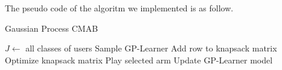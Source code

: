 The pseudo code of the algoritm we implemented is as follow.
\begin{algorithm}
	\caption{Gaussian Process CMAB}
	\begin{algorithmic}[1]
		\STATE $J\gets ${ all classes of users}
		\STATE Sample GP-Learner
		\STATE Add row to knapsack matrix
		\ENDFOR
		\STATE Optimize knapsack matrix
		\STATE Play selected arm
		\STATE Update GP-Learner model
	\end{algorithmic}
\end{algorithm}